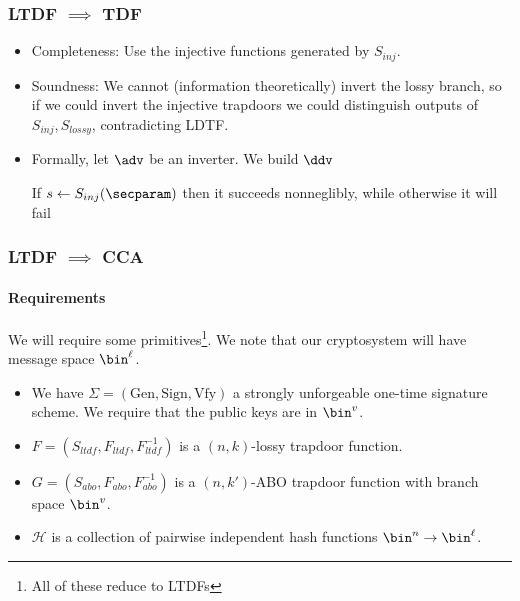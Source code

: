 \documentclass{beamer}
\begin{document}
\begin{frame}
    \frametitle{LTDF $\implies$ TDF}
    \begin{itemize}
        \item Completeness: Use the injective functions generated by $S_{inj}$.
        \item Soundness: We cannot (information theoretically) invert the lossy branch,
              so if we could invert the injective trapdoors we could distinguish outputs
              of $S_{inj}, S_{lossy}$, contradicting LDTF.
        \item Formally, let $\adv$ be an inverter. We build $\ddv$
              \begin{pchstack}[center]
              \end{pchstack}
              If $s \leftarrow S_{inj}(\secparam)$ then it succeeds nonneglibly, while otherwise it will fail
    \end{itemize}
\end{frame}



\begin{frame}
    \frametitle{LTDF $\implies$ CCA}
    \framesubtitle{Requirements}
    We will require some primitives\footnote{All of these reduce to LTDFs}.
    We note that our cryptosystem will have message space $\bin^\ell$.
    \begin{itemize}
        \item We have $\Sigma = (\mathrm{Gen}, \mathrm{Sign}, \mathrm{Vfy})$ a strongly unforgeable one-time signature scheme. We require that the public keys are in $\bin^v$.
        \item $F = (S_{ltdf}, F_{ltdf}, F^{-1}_{ltdf})$ is a $(n, k)$-lossy trapdoor function.
        \item $G = (S_{abo}, F_{abo}, F^{-1}_{abo})$ is a $(n, k')$-ABO trapdoor function with branch space $\bin^v$.
        \item $\mathcal{H}$ is a collection of pairwise independent hash functions $\bin^n \to \bin^\ell$.
    \end{itemize}
\end{frame}
\end{document}

